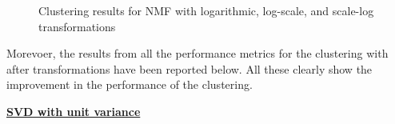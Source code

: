 \documentclass{article}
\begin{document}
\begin{figure}[!ht]%
	\centering
		\qquad		
		\qquad		
		
		\vspace*{-3mm}
	\caption{Clustering results for NMF with logarithmic, log-scale, and scale-log transformations}
	\label{fig:nmf_transform}
\end{figure}


Morevoer, the results from all the performance metrics for the clustering with after transformations have been reported below. All these clearly show the improvement in the performance of the clustering. 

\newpage

\underline{\textbf{SVD with unit variance}} 
\end{document}
